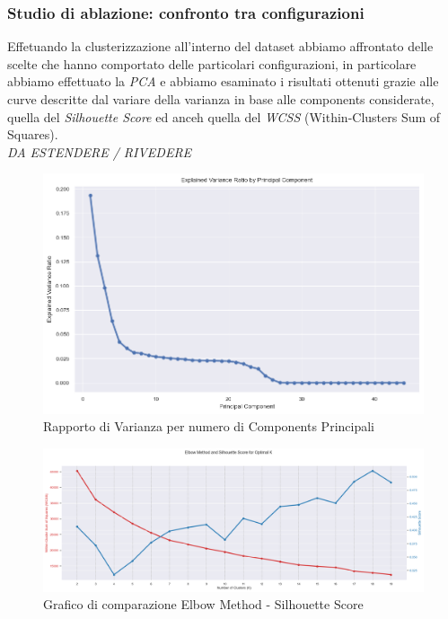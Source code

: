 \documentclass[12pt,a4paper,twoside]{article}
\begin{document}
\subsubsection{Studio di ablazione: confronto tra configurazioni}
Effetuando la clusterizzazione all'interno del dataset abbiamo affrontato delle scelte che hanno 
comportato delle particolari configurazioni, in particolare abbiamo effettuato la \textit{PCA} e 
abbiamo esaminato i risultati ottenuti grazie alle curve descritte dal variare della varianza in 
base alle components considerate, quella del \textit{Silhouette Score} ed anceh quella del 
\textit{WCSS} (Within-Clusters Sum of Squares).\\
\textit{DA ESTENDERE / RIVEDERE}
\begin{figure}[!ht]
    \centering
    \includegraphics[width=\textwidth, height=\textheight, keepaspectratio]{assets/variance-ratio.png}
    \caption{Rapporto di Varianza per numero di Components Principali}
    \label{fig:variance-ratio}
\end{figure}
\begin{figure}[!ht]
    \centering
    \includegraphics[width=\textwidth, height=\textheight, keepaspectratio]{assets/elbow-silhouette.png}
    \caption{Grafico di comparazione Elbow Method - Silhouette Score}
    \label{fig:elbow-silhouette}
\end{figure}
\end{document}
